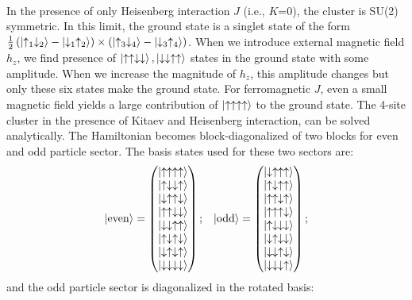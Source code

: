 \documentclass[aps,amsmath,twocolumn,amssymb,floatfix,showpacs,superscriptaddress,nofootinbib,longbibliography]{revtex4-1}
\begin{document}
\\
In the presence of only Heisenberg interaction $J$ (i.e., $K$=0), the cluster is SU(2) symmetric.  In this limit, the ground state is a singlet state of the form $\frac{1}{2}\left(\ket{\uparrow_1\downarrow_2}-\ket{\downarrow_1\uparrow_2}\right)\times\left(\ket{\uparrow_3\downarrow_4}-\ket{\downarrow_3\uparrow_4}\right)$. When we introduce external magnetic field $h_z$, we find presence of $\ket{\uparrow\uparrow\downarrow\downarrow},\ket{\downarrow\downarrow\uparrow\uparrow}$ states in the ground state with some amplitude. When we increase the magnitude of $h_z$, this amplitude changes but only these six states make the ground state.  For ferromagnetic $J$, even a small magnetic field yields a large contribution of  $\ket{\uparrow\uparrow\uparrow\uparrow}$ to the ground state. The 4-site cluster in the presence of Kitaev and Heisenberg interaction, can be solved analytically. The Hamiltonian becomes block-diagonalized of two blocks for even and odd particle sector. The basis states used for these two sectors are:
\begin{eqnarray}
	\ket{\rm even}=
	\begin{pmatrix}
		\ket{\uparrow\uparrow\uparrow\uparrow}\\
		\ket{\uparrow\downarrow\downarrow\uparrow}	\\
		\ket{\downarrow\uparrow\uparrow\downarrow}	\\
		\ket{\uparrow\uparrow\downarrow\downarrow}	\\
		\ket{\downarrow\downarrow\uparrow\uparrow}	\\
		\ket{\uparrow\downarrow\uparrow\downarrow}	\\
		\ket{\downarrow\uparrow\downarrow\uparrow}	\\
		\ket{\downarrow\downarrow\downarrow\downarrow}
	\end{pmatrix};
	&&
	\ket{\rm odd}=
	\begin{pmatrix}
		\ket{\downarrow\uparrow\uparrow\uparrow}\\
		\ket{\uparrow\downarrow\uparrow\uparrow}\\
		\ket{\uparrow\uparrow\downarrow\uparrow}\\
		\ket{\uparrow\uparrow\uparrow\downarrow}\\
		\ket{\uparrow\downarrow\downarrow\downarrow}\\
		\ket{\downarrow\uparrow\downarrow\downarrow}\\
		\ket{\downarrow\downarrow\uparrow\downarrow}\\
		\ket{\downarrow\downarrow\downarrow\uparrow}
	\end{pmatrix};
\end{eqnarray}
and the odd particle sector is diagonalized in the rotated basis:
\end{document}
